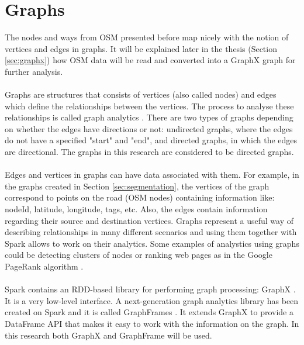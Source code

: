 \section{Graphs}\label{sec:graphs}
The nodes and ways from \ac{OSM} presented before map nicely with the notion of vertices and edges in graphs. It will be explained later in the thesis (Section \ref{sec:graphx}) how \ac{OSM} data will be read and converted into a GraphX graph for further analysis. 
\\
\\
Graphs are structures that consists of vertices (also called nodes) and edges which define the relationships between the vertices. The process to analyse these relationships is called graph analytics \cite{spark-guide}. 
There are two types of graphs depending on whether the edges have directions or not: undirected graphs, where the edges do not have a specified "start" and "end", and directed graphs, in which the edges are directional. The graphs in this research are considered to be directed graphs. 
\\
\\
Edges and vertices in graphs can have data associated with them. For example, in the graphs created in Section \ref{sec:segmentation}, the vertices of the graph correspond to points on the road (\ac{OSM} nodes) containing information like: nodeId, latitude, longitude, tags, etc. Also, the edges contain information regarding their source and destination vertices.
Graphs represent a useful way of describing relationships in many different scenarios and using them together with Spark allows to work on their analytics. Some examples of analystics using graphs could be detecting clusters of nodes or ranking web pages as in the Google PageRank algorithm \cite{spark-guide}. 
\\
\\
Spark contains an RDD-based library for performing graph processing: GraphX \cite{graphx}. It is a very low-level interface. A next-generation graph analytics library has been created on Spark and it is called GraphFrames \cite{graphframe}. It extends GraphX to provide a DataFrame API that makes it easy to work with the information on the graph. In this research both GraphX and GraphFrame will be used. 



















